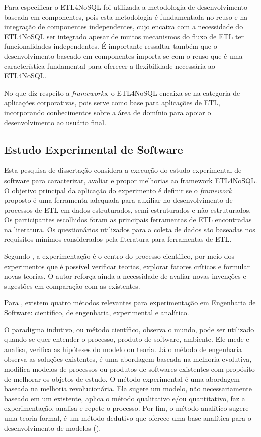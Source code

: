 Para especificar o ETL4NoSQL foi utilizada a metodologia de desenvolvimento baseada em componentes, pois esta metodologia é fundamentada no reuso e na integração de componentes independentes, cujo encaixa com a necessidade do ETL4NoSQL ser integrado apesar de muitos mecanismos do fluxo de ETL ter funcionalidades independentes. É importante ressaltar também que o desenvolvimento baseado em componentes importa-se com o reuso que é uma característica fundamental para oferecer a flexibilidade necessária ao ETL4NoSQL.

No que diz respeito a \textit{frameworks}, o ETL4NoSQL encaixa-se na categoria de aplicações corporativas, pois serve como base para aplicações de ETL, incorporando conhecimentos sobre a área de domínio para apoiar o desenvolvimento ao usuário final.




\subsection{Estudo Experimental de Software}

Esta pesquisa de dissertação considera a execução do estudo experimental de software para caracterizar, avaliar e propor melhorias ao framework ETL4NoSQL. O objetivo principal da aplicação do experimento é definir se o \textit{framework} proposto é uma ferramenta adequada para auxiliar no desenvolvimento de processos de ETL em dados estruturados, semi estruturados e não estruturados. Os participantes escolhidos foram as principais ferramentas de ETL encontradas na literatura. Os questionários utilizados para a coleta de dados são baseadas nos requisitos mínimos considerados pela literatura para ferramentas de ETL.

Segundo \cite{travassos:2002}, a experimentação é o centro do processo científico, por meio dos experimentos que é possível verificar teorias, explorar fatores críticos e formular novas teorias. O autor reforça ainda a necessidade de avaliar novas invenções e sugestões em comparação com as existentes.

Para \cite{wohlin:2000}, existem quatro métodos relevantes para experimentação em Engenharia de Software: científico, de engenharia, experimental e analítico. 

O paradigma indutivo, ou método científico, observa o mundo, pode ser utilizado quando se quer entender o processo, produto de software, ambiente. Ele mede e analisa, verifica as hipóteses do modelo ou teoria.  Já o método de engenharia observa as soluções existentes, é uma abordagem baseada na melhoria evolutiva, modifica modelos de processos ou produtos de softwares existentes com propósito de melhorar os objetos de estudo. O método experimental é uma abordagem baseada na melhoria revolucionária. Ela sugere um modelo, não necessariamente baseado em um existente, aplica o método qualitativo e/ou quantitativo, faz a experimentação, analisa e repete o processo. Por fim, o método analítico sugere uma teoria formal, é um método dedutivo que oferece uma base analítica para o desenvolvimento de modelos (\cite{travassos:2002}).

